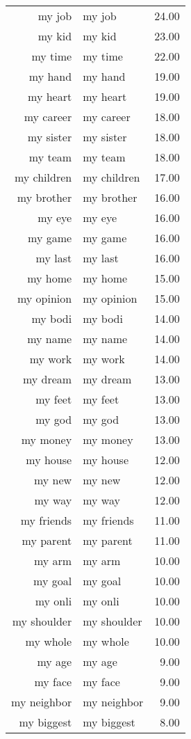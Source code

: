 \begin{table}[ht]
\begin{tabular}{rlr}
  my job & my job & 24.00 \\ 
  my kid & my kid & 23.00 \\ 
  my time & my time & 22.00 \\ 
  my hand & my hand & 19.00 \\ 
  my heart & my heart & 19.00 \\ 
  my career & my career & 18.00 \\ 
  my sister & my sister & 18.00 \\ 
  my team & my team & 18.00 \\ 
  my children & my children & 17.00 \\ 
  my brother & my brother & 16.00 \\ 
  my eye & my eye & 16.00 \\ 
  my game & my game & 16.00 \\ 
  my last & my last & 16.00 \\ 
  my home & my home & 15.00 \\ 
  my opinion & my opinion & 15.00 \\ 
  my bodi & my bodi & 14.00 \\ 
  my name & my name & 14.00 \\ 
  my work & my work & 14.00 \\ 
  my dream & my dream & 13.00 \\ 
  my feet & my feet & 13.00 \\ 
  my god & my god & 13.00 \\ 
  my money & my money & 13.00 \\ 
  my house & my house & 12.00 \\ 
  my new & my new & 12.00 \\ 
  my way & my way & 12.00 \\ 
  my friends & my friends & 11.00 \\ 
  my parent & my parent & 11.00 \\ 
  my arm & my arm & 10.00 \\ 
  my goal & my goal & 10.00 \\ 
  my onli & my onli & 10.00 \\ 
  my shoulder & my shoulder & 10.00 \\ 
  my whole & my whole & 10.00 \\ 
  my age & my age & 9.00 \\ 
  my face & my face & 9.00 \\ 
  my neighbor & my neighbor & 9.00 \\ 
  my biggest & my biggest & 8.00 \\ 

\end{tabular}
\end{table}
